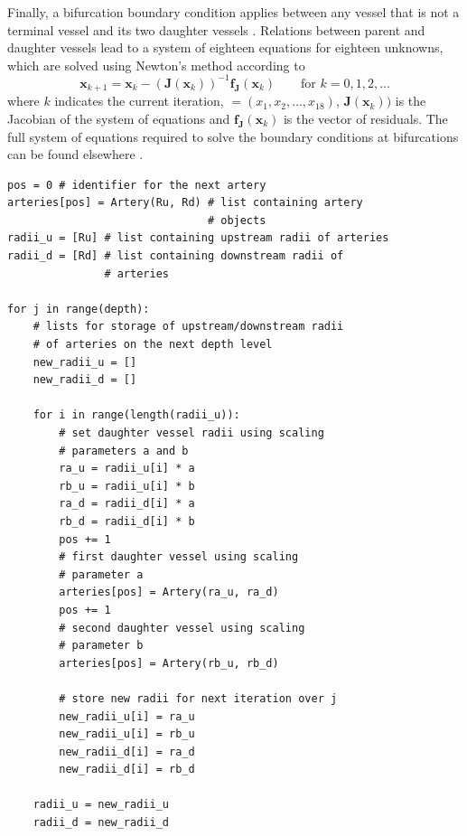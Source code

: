 \documentclass{jors}
\begin{document}
Finally, a bifurcation boundary condition applies between any vessel that is not a terminal vessel and its two daughter vessels \cite{Olufsen2000,Kolachalama2007}. Relations between parent and daughter vessels lead to a system of eighteen equations for eighteen unknowns, which are solved using Newton's method according to
\begin{equation}\label{eq:newton}
\boldsymbol{x}_{k+1} = \boldsymbol{x}_k - (\boldsymbol{J}(\boldsymbol{x}_k))^{-1} \boldsymbol{f_J}(\boldsymbol{x}_k) \qquad \text{for } k = 0, 1, 2, \ldots
\end{equation}
where $k$ indicates the current iteration, $\boldsymbol = (x_1, x_2, \ldots, x_{18})$, $\boldsymbol{J}(\boldsymbol{x}_k))$ is the Jacobian of the system of equations and $\boldsymbol{f_J}(\boldsymbol{x}_k)$ is the vector of residuals. The full system of equations required to solve the boundary conditions at bifurcations can be found elsewhere \cite{Diem2016a,Olufsen1998}.

\begin{lstlisting}[frame=single,caption={Setup routine for a network of arteries. The artery network is created as a binary tree and contains $2^{\text{depth}}-1$ arteries. At each depth level the up- and downstream radii of daughter vessels are calculated using the scaling parameters $a$ and $b$. Artery objects are then created for each new daughter vessel and stored in a list.}, label=alg:arterynetwork]
pos = 0 # identifier for the next artery
arteries[pos] = Artery(Ru, Rd) # list containing artery
                               # objects
radii_u = [Ru] # list containing upstream radii of arteries
radii_d = [Rd] # list containing downstream radii of
               # arteries

for j in range(depth):
    # lists for storage of upstream/downstream radii
    # of arteries on the next depth level
    new_radii_u = []
    new_radii_d = []

    for i in range(length(radii_u)):
        # set daughter vessel radii using scaling
        # parameters a and b    
        ra_u = radii_u[i] * a
        rb_u = radii_u[i] * b
        ra_d = radii_d[i] * a
        rb_d = radii_d[i] * b
        pos += 1
        # first daughter vessel using scaling 
        # parameter a
        arteries[pos] = Artery(ra_u, ra_d)
        pos += 1
        # second daughter vessel using scaling 
        # parameter b
        arteries[pos] = Artery(rb_u, rb_d)

        # store new radii for next iteration over j
        new_radii_u[i] = ra_u
        new_radii_u[i] = rb_u
        new_radii_d[i] = ra_d
        new_radii_d[i] = rb_d

    radii_u = new_radii_u
    radii_d = new_radii_d
\end{lstlisting}
\end{document}
